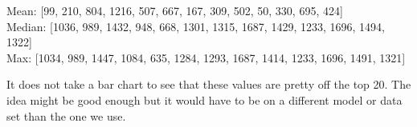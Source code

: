 {\small
\noindent Mean: [99, 210, 804, 1216, 507, 667, 167, 309, 502, 50, 330, 695, 424] \\
Median: [1036, 989, 1432, 948, 668, 1301, 1315, 1687, 1429, 1233, 1696, 1494, 1322] \\
Max: [1034, 989, 1447, 1084, 635, 1284, 1293, 1687, 1414, 1233, 1696, 1491, 1321] \\
}

It does not take a bar chart to see that these values are pretty off
the top 20. The idea might be good enough but it would have to be on a
different model or data set than the one we use.
